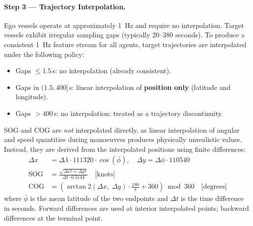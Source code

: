 \documentclass[12pt, a4paper]{article}
\begin{document}
  \paragraph{Step 3 --- Trajectory Interpolation.}
  Ego vessels operate at approximately 1~Hz and require no interpolation. Target vessels exhibit irregular sampling gaps (typically 20--380 seconds). To produce a consistent 1~Hz feature stream for all agents,
  target trajectories are interpolated under the following policy:
  \begin{itemize}
      \item Gaps $\leq 1.5$\,s: no interpolation (already consistent).
      \item Gaps in $(1.5, 400]$\,s: linear interpolation of \textbf{position only} (latitude and longitude).
      \item Gaps $> 400$\,s: no interpolation; treated as a trajectory discontinuity.
  \end{itemize}

  SOG and COG are \textit{not} interpolated directly, as linear interpolation of angular and speed quantities during manoeuvres produces physically unrealistic values. Instead, they are derived from the
  interpolated positions using finite differences:
  \begin{align}
      \Delta x &= \Delta\lambda \cdot 111320 \cdot \cos(\bar{\phi}), \quad
      \Delta y  = \Delta\phi \cdot 110540 \label{eq:haversine}\\[4pt]
      \text{SOG} &= \frac{\sqrt{\Delta x^2 + \Delta y^2}}{\Delta t \cdot 0.5144} \quad \text{[knots]} \\[4pt]
      \text{COG} &= \!\left(\arctan2(\Delta x,\;\Delta y)\cdot\frac{180}{\pi} + 360\right) \bmod 360 \quad \text{[degrees]}
  \end{align}
  where $\bar{\phi}$ is the mean latitude of the two endpoints and $\Delta t$ is the time difference in seconds. Forward differences are used at interior interpolated points; backward differences at the terminal
   point.
\end{document}
